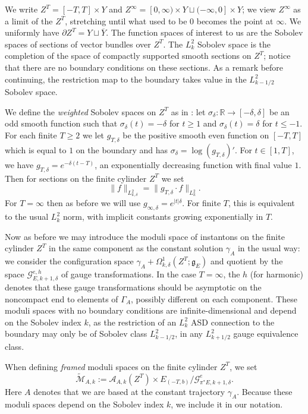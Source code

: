 \documentclass[10pt,a4paper]{amsart}
\newcommand{\pE}{\pi^* \! E}
\theoremstyle{definition}
\theoremstyle{remark}
\numberwithin{figure}{qchap}
\begin{document}
We write $Z^T = [-T, T] \times Y$ and $Z^\infty = [0, \infty) \times Y \sqcup (-\infty, 0] \times Y$; we view $Z^\infty$ as a limit of the $Z^T$, stretching until what used to be $0$ becomes the point at $\infty$. We uniformly have $\partial Z^T = Y \sqcup \overline Y$. The function spaces of interest to us are the Sobolev spaces of sections of vector bundles over $Z^T$. The $L^2_k$ Sobolev space is the completion of the space of compactly supported smooth sections on $Z^T$; notice that there are no boundary conditions on these sections. As a remark before continuing, the restriction map to the boundary takes value in the $L^2_{k-1/2}$ Sobolev space.

We define the \emph{weighted} Sobolev spaces on $Z^T$ as in \cite[Page~72]{Lin}: let $\sigma_\delta: \mathbb R \to [-\delta, \delta]$ be an odd smooth function such that $\sigma_\delta(t) = -\delta$ for $t \geq 1$ and $\sigma_\delta(t) = \delta$ for $t \leq -1$. For each finite $T \geq 2$ we let $g_{T,\delta}$ be the positive smooth even function on $[-T, T]$ which is equal to $1$ on the boundary and has $\sigma_\delta = \log(g_{T,\delta})'$. For $t \in [1, T]$, we have $g_{T,\delta} = e^{-\delta(t-T)}$, an exponentially decreasing function with final value $1$. Then for sections on the finite cylinder $Z^T$ we set 
$$\|f\|_{L^2_{k,\delta}} = \|g_{T, \delta} \cdot f\|_{L^2_k}.$$ 
For $T = \infty$ then as before we will use $g_{\infty, \delta} = e^{|t|\delta}$. For finite $T$, this is equivalent to the usual $L^2_k$ norm, with implicit constants growing exponentially in $T$. 

Now as before we may introduce the moduli space of instantons on the finite cylinder $Z^T$ in the same component as the constant solution $\gamma_A$ in the usual way: we consider the configuration space $\gamma_A + \Omega^1_{k,\delta}(Z^T;\mathfrak g_E)$ and quotient by the space $\mathcal G^{e,h}_{E,k+1,\delta}$ of gauge transformations. In the case $T = \infty$, the $h$ (for harmonic) denotes that these gauge transformations should be asymptotic on the noncompact end to elements of $\Gamma_A$, possibly different on each component. 
These moduli spaces with no boundary conditions are infinite-dimensional and depend on the Sobolev index $k$, as the restriction of an $L^2_k$ ASD connection to the boundary may only be of Sobolev class $L^2_{k-1/2}$, in any $L^2_{k+1/2}$ gauge equivalence class.

When defining \emph{framed} moduli spaces on the finite cylinder $Z^T$, we set 
$$\widetilde{\mathcal M}_{A,k} := \mathcal A_{A,k}(Z^T) \times E_{(-T,b)}\big/ \mathcal G^{e}_{\pE,k+1,\delta}.$$ 
Here $A$ denotes that we are based at the constant trajectory $\gamma_A$. Because these moduli spaces depend on the Sobolev index $k$, we include it in our notation.
\end{document}
